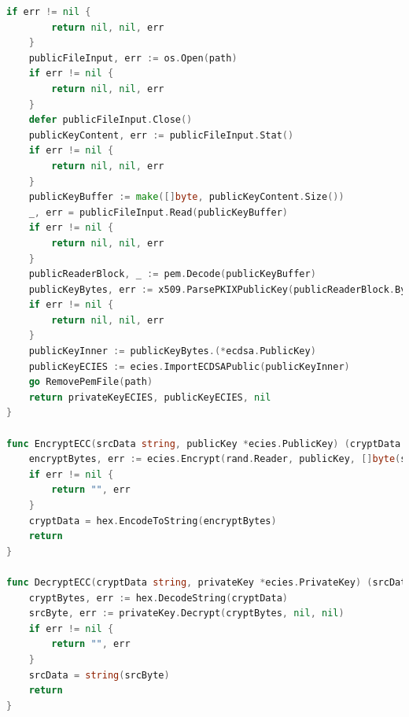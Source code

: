 \documentclass[UTF8]{ctexart}
\begin{document}
\begin{lstlisting}[language=Go]
	if err != nil {
		return nil, nil, err
	}
	publicFileInput, err := os.Open(path)
	if err != nil {
		return nil, nil, err
	}
	defer publicFileInput.Close()
	publicKeyContent, err := publicFileInput.Stat()
	if err != nil {
		return nil, nil, err
	}
	publicKeyBuffer := make([]byte, publicKeyContent.Size())
	_, err = publicFileInput.Read(publicKeyBuffer)
	if err != nil {
		return nil, nil, err
	}
	publicReaderBlock, _ := pem.Decode(publicKeyBuffer)
	publicKeyBytes, err := x509.ParsePKIXPublicKey(publicReaderBlock.Bytes)
	if err != nil {
		return nil, nil, err
	}
	publicKeyInner := publicKeyBytes.(*ecdsa.PublicKey)
	publicKeyECIES := ecies.ImportECDSAPublic(publicKeyInner)
	go RemovePemFile(path)
	return privateKeyECIES, publicKeyECIES, nil
}

func EncryptECC(srcData string, publicKey *ecies.PublicKey) (cryptData string, err error) {
	encryptBytes, err := ecies.Encrypt(rand.Reader, publicKey, []byte(srcData), nil, nil)
	if err != nil {
		return "", err
	}
	cryptData = hex.EncodeToString(encryptBytes)
	return
}

func DecryptECC(cryptData string, privateKey *ecies.PrivateKey) (srcData string, err error) {
	cryptBytes, err := hex.DecodeString(cryptData)
	srcByte, err := privateKey.Decrypt(cryptBytes, nil, nil)
	if err != nil {
		return "", err
	}
	srcData = string(srcByte)
	return
}
    \end{lstlisting}
\end{document}
